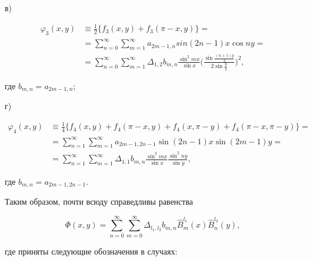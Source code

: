  


в) 


\begin{align*} 


\varphi_3(x,y)&\equiv\frac{1}{2}\{f_3(x,y)+f_3(\pi-x,y)\}= \\ 


% 


&= \sum^\infty_{n=0}\sum^\infty_{m=1}a_{2m-1,n}sin(2n-1)x\cos ny= \\ 


% 


&=\sum^\infty_{n=0}\sum^\infty_{m=1}\Delta_{1,2}b_{m,n} 


\frac{\sin^2mx}{\sin x} 


\biggl(\frac{\sin\frac{(n+1)y}{2}}{2\sin\frac{y}{2}}\biggr)^2, 


\end{align*} 


где $b_{m,n}=a_{2m-1,n}$; 


 


г) 


\begin{align*} 


\varphi_4(x,y)&\equiv\frac{1}{4}\{f_4(x,y)+f_4(\pi-x,y) 


+f_4(x,\pi-y)+f_4(\pi-x,\pi-y)\}= \\ 


% 


&= \sum^\infty_{n=1}\sum^\infty_{m=1}a_{2m-1,2n-1}\sin(2n-1)x 


\sin(2m-1)y= \\ 


% 


&=\sum^\infty_{n=1}\sum^\infty_{m=1}\Delta_{1,1}b_{m,n} 


\frac{\sin^2mx}{\sin x}\frac{\sin^2ny}{\sin y}, 


\end{align*} 


где $b_{m,n}=a_{2m-1,2n-1}$. 


 


Таким образом, почти всюду справедливы равенства 


$$ 


\Phi(x,y)=\sum^\infty_{n=0}\sum^\infty_{m=0}


\Delta_{l_1,l_2}b_{m,n}\widehat B_m^{l_1}(x)\widehat B_n^{l_2}(y), 


$$ 


где приняты следующие обозначения в случаях: 


